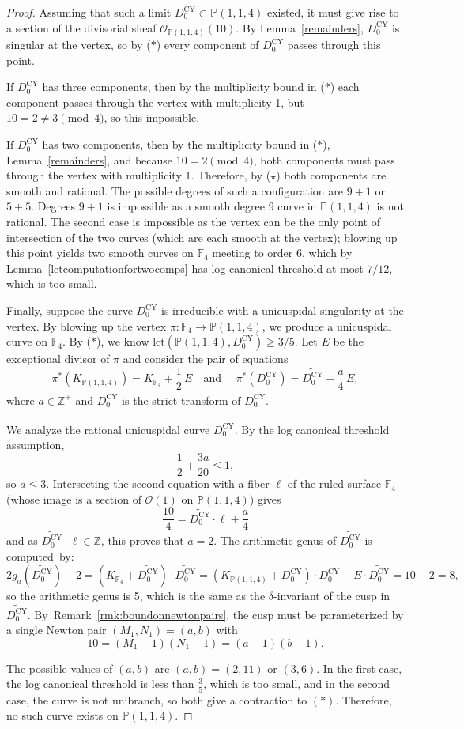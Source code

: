 \documentclass[JEP,XML,SOM,Unicode,NoFloatCountersInSection,published]{cedram}
\theoremstyle{plain}
\theoremstyle{definition}
\newcommand\FF{{\mathbb F}}
\newcommand\PP{{\mathbb{P}}}
\newcommand\ZZ{{\mathbb Z}}
\newcommand\Oc{{\mathcal O}}
\newcommand\lct{\mathrm{lct}}
\newcommand\Dcyo{{D^{\mathrm{CY}}_0}}
\begin{document}
\begin{proof}
Assuming that such a limit $\Dcyo\subset \PP(1,1,4)$ existed, it must give rise to a section of the divisorial sheaf $\Oc_{\PP(1,1,4)}(10)$. By Lemma~\ref{remainders}, $\Dcyo$ is singular at the vertex, so by ($\ast$) every component of $\Dcyo$ passes through this point.

If $\Dcyo$ has three components, then by the multiplicity bound in ($\ast$) each component passes through the vertex with multiplicity 1, but $10 = 2 \ne 3 \pmod 4$, so this impossible.

If $\Dcyo$ has two components, then by the multiplicity bound in ($\ast$), Lemma~\ref{remainders}, and because $10 = 2 \pmod 4$, both components must pass through the vertex with multiplicity 1. Therefore, by ($\star$) both components are smooth and rational. The possible degrees of such a configuration are $9+1$ or $5+5$. Degrees $9+1$ is impossible as a smooth degree 9 curve in $\PP(1,1,4)$ is not rational. The second case is impossible as the vertex can be the only point of intersection of the two curves (which are each smooth at the vertex); blowing up this point yields two smooth curves on $\FF_4$ meeting to order 6, which by Lemma~\ref{lctcomputationfortwocomps} has log canonical threshold at most $7/12$, which is too small.

Finally, suppose the curve $\Dcyo$ is irreducible with a unicuspidal singularity at the vertex. By blowing up the vertex $\pi: \FF_4 \to \PP(1,1,4)$, we produce a unicuspidal curve on $\FF_4$. By ($\ast$), we know $\lct(\PP(1,1,4), \Dcyo)\ge 3/5$. Let $E$ be the exceptional divisor of $\pi$ and consider the pair of equations
\[
\pi^*(K_{\PP(1,1,4)}) = K_{\FF_4} + \frac{1}{2}\, E\quad\text{and }\quad \pi^*(\Dcyo) = \widetilde{\Dcyo} + \frac{a}{4}\, E,
\]
where $a \in \ZZ^+$ and $\widetilde{\Dcyo}$ is the strict transform of $\Dcyo$.

We analyze the rational unicuspidal curve $\widetilde{\Dcyo}$. By the log canonical threshold assumption, \[\frac{1}{2} + \frac{3a}{20} \le 1,\] so $a \le 3$. Intersecting the second equation with a fiber $\ell$ of the ruled surface $\FF_4$ (whose image is a section of $\Oc(1)$ on $\PP(1,1,4)$) gives \[ \frac{10}{4} = \widetilde{\Dcyo} \cdot \ell + \frac{a}{4} \] and as $\widetilde{\Dcyo} \cdot \ell\! \in\! \ZZ$, this proves that $a \!=\! 2$. The arithmetic genus of $\widetilde{\Dcyo}$ is computed~by:
\[ 2g_a(\widetilde{\Dcyo}) - 2 = (K_{\FF_4} + \widetilde{\Dcyo})\cdot \widetilde{\Dcyo} = (K_{\PP(1,1,4)} + \Dcyo)\cdot \Dcyo - E \cdot \widetilde{\Dcyo} = 10 - 2 = 8, \] so the arithmetic genus is 5, which is the same as the $\delta$-invariant of the cusp in $\widetilde{\Dcyo}$. By~Remark~\ref{rmk:boundonnewtonpairs}, the cusp must be parameterized by a single Newton pair $(M_1, N_1) = (a,b)$ with
\[ 10 = (M_1 - 1)(N_1 - 1) = (a-1)(b-1).\]

The possible values of $(a,b)$ are $(a,b) = (2,11)$ or $(3,6)$. In the first case, the log canonical threshold is less than $\frac{3}{5}$, which is too small, and in the second case, the curve is not unibranch, so both give a contraction to $(\ast)$. Therefore, no such curve exists on $\PP(1,1,4)$.
\end{proof}
\end{document}
